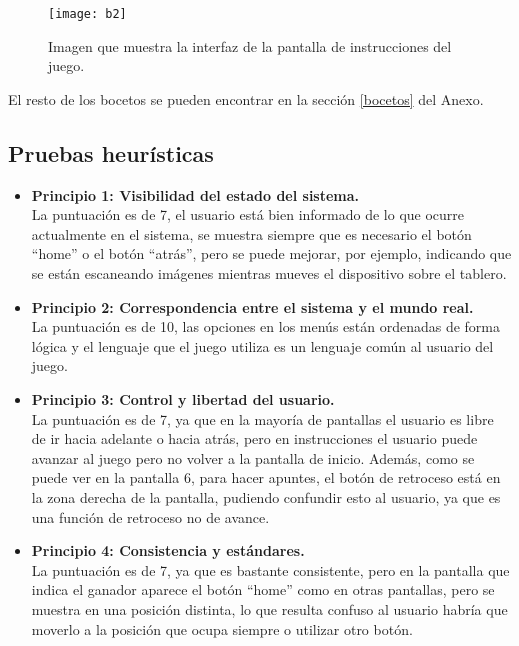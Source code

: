 \begin{figure}[h]
  \centering
  \texttt{[image: b2]}
  \caption{Imagen que muestra la interfaz de la pantalla de instrucciones del juego.\protect\footnotemark}
  \label{figura-b2}
\end{figure}

El resto de los bocetos se pueden encontrar en la sección \ref{bocetos} del Anexo.

\subsection{Pruebas heurísticas}
\begin{itemize}

  \item \textbf{Principio 1: Visibilidad del estado del sistema.}\\
  La puntuación es de 7, el usuario está bien informado de lo que ocurre actualmente en el sistema, se muestra siempre que es necesario el botón “home” o el botón “atrás”, pero se puede mejorar, por ejemplo, indicando que se están escaneando imágenes mientras mueves el dispositivo sobre el tablero.

  \item \textbf{Principio 2: Correspondencia entre el sistema y el mundo real.}\\
  La puntuación es de 10, las opciones en los menús están ordenadas de forma lógica y el lenguaje que el juego utiliza es un lenguaje común al usuario del juego.

  \item \textbf{Principio 3: Control y libertad del usuario.}\\
  La puntuación es de 7, ya que en la mayoría de pantallas el usuario es libre de ir hacia adelante o hacia atrás, pero en instrucciones el usuario puede avanzar al juego pero no volver a la pantalla de inicio. Además, como se puede ver en la pantalla 6, para hacer apuntes, el botón de retroceso está en la zona derecha de la pantalla, pudiendo confundir esto al usuario, ya que es una función de retroceso no de avance.

  \item \textbf{Principio 4: Consistencia y estándares.}\\
  La puntuación es de 7, ya que es bastante consistente, pero en la pantalla que indica el ganador aparece el botón “home” como en otras pantallas, pero se muestra en una posición distinta, lo que resulta confuso al usuario habría que moverlo a la posición que ocupa siempre o utilizar otro botón.


\end{itemize}
